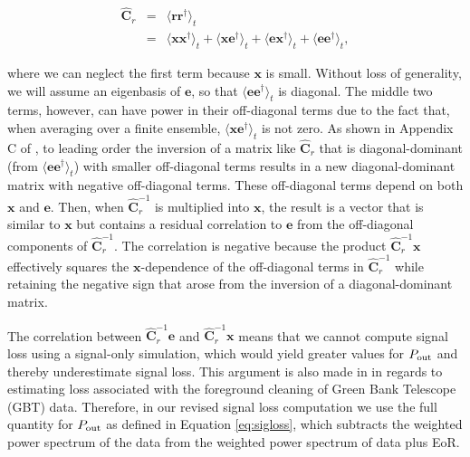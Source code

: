\documentclass[preprint2,numberedappendix,tighten]{aastex6}  %
\begin{document}
\begin{eqnarray}
\widehat{\textbf{C}}_{r} &=& \langle \textbf{rr}^{\dagger} \rangle_{t} \nonumber \\ 
&=& \langle \textbf{xx}^{\dagger} \rangle_{t} + \langle \textbf{xe}^{\dagger} \rangle_{t} + \langle \textbf{ex}^{\dagger} \rangle_{t} + \langle 
\textbf{ee}^{\dagger} \rangle_{t},
\end{eqnarray}

\noindent where we can neglect the first term because $\textbf{x}$ is small.  Without loss of generality, we will assume
an eigenbasis of $\textbf{e}$, so that $\langle 
\textbf{ee}^{\dagger} \rangle_{t}$ is diagonal. The middle 
two terms, however, can have power in their off-diagonal terms due to the fact that, when averaging over a finite
ensemble, $\langle\textbf{xe}^\dagger\rangle_t$ is not zero.  As shown in Appendix C of \citet{parsons_et_al2014}, to leading order the inversion of a matrix like $\widehat{\textbf{C}}_{r}$ that is diagonal-dominant (from $\langle 
\textbf{ee}^{\dagger} \rangle_{t}$) with smaller
off-diagonal terms results in a new diagonal-dominant matrix with negative off-diagonal terms. These off-diagonal
terms depend on both $\textbf{x}$ and $\textbf{e}$. Then, when $\widehat{\textbf{C}}^{-1}_{r}$ is multiplied into $\textbf{x}$,
the result is a vector that is similar to $\textbf{x}$ but
contains a residual correlation to $\textbf{e}$ from the off-diagonal components of $\widehat{\textbf{C}}^{-1}_{r}$. The
correlation is negative because the product $\widehat{\textbf{C}}_r^{-1}\textbf{x}$ effectively squares the $\textbf{x}$-dependence
of the off-diagonal terms in $\widehat{\textbf{C}}^{-1}_{r}$ while retaining the negative sign that arose from the inversion
of a diagonal-dominant matrix.

The correlation between $\widehat{\textbf{C}}_r^{-1}\textbf{e}$ and $\widehat{\textbf{C}}_r^{-1}\textbf{x}$ means that we cannot compute signal loss using a signal-only 
simulation, which would yield greater values for $P_{\rm out}$ and thereby underestimate signal loss. This argument is also made in \citet{switzer_et_al2015} in regards to estimating loss associated with the foreground cleaning of Green Bank Telescope (GBT) data. Therefore, in our revised 
signal loss computation we use the full quantity for $P_{\rm out}$ as defined in Equation \eqref{eq:sigloss}, which subtracts the 
weighted power spectrum of the data from the weighted power spectrum of data plus EoR. 
\end{document}
